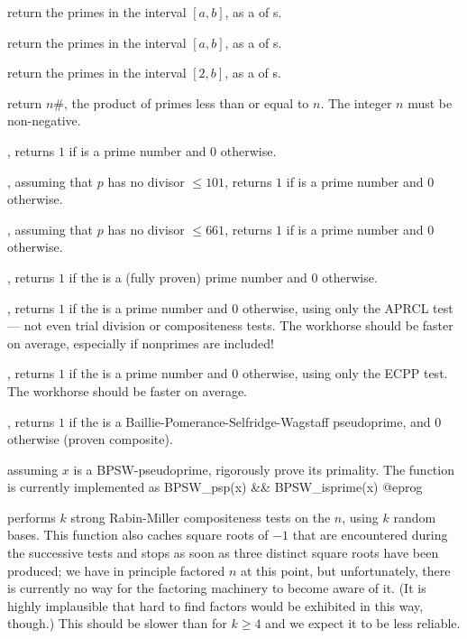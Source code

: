  return the primes in the interval
$[a,b]$, as a  of s.

 return the primes in the
interval $[a,b]$, as a  of s.

 return the primes in the interval $[2,b]$,
as a  of s.

 return $n\#$, the product of primes less than
or equal to $n$. The integer $n$ must be non-negative.


, returns $1$ if  is a prime number and
$0$ otherwise.

, assuming that $p$ has no divisor $\leq
101$, returns $1$ if  is a prime number and $0$ otherwise.

, assuming that $p$ has no divisor $\leq
661$, returns $1$ if  is a prime number and $0$ otherwise.

, returns $1$ if the   is a
(fully proven) prime number and $0$ otherwise.

, returns $1$ if the   is a
prime number and $0$ otherwise, using only the APRCL test --- not even trial
division or compositeness tests. The workhorse  should be
faster on average, especially if nonprimes are included!

, returns $1$ if the   is a
prime number and $0$ otherwise, using only the ECPP test. The workhorse
 should be faster on average.

, returns $1$ if the   is a
Baillie-Pomerance-Selfridge-Wagstaff pseudoprime, and $0$ otherwise (proven
composite).

 assuming $x$ is a BPSW-pseudoprime, rigorously
prove its primality. The function  is currently implemented
as
\bprog
 BPSW_psp(x) && BPSW_isprime(x)
@eprog

 performs $k$ strong Rabin-Miller
compositeness tests on the  $n$, using $k$ random bases. This
function also caches square roots of $-1$ that are encountered during the
successive tests and stops as soon as three distinct square roots have been
produced; we have in principle factored $n$ at this point, but
unfortunately, there is currently no way for the factoring machinery to
become aware of it. (It is highly implausible that hard to find factors
would be exhibited in this way, though.) This should be slower than
 for $k\geq 4$ and we expect it to be less reliable.

